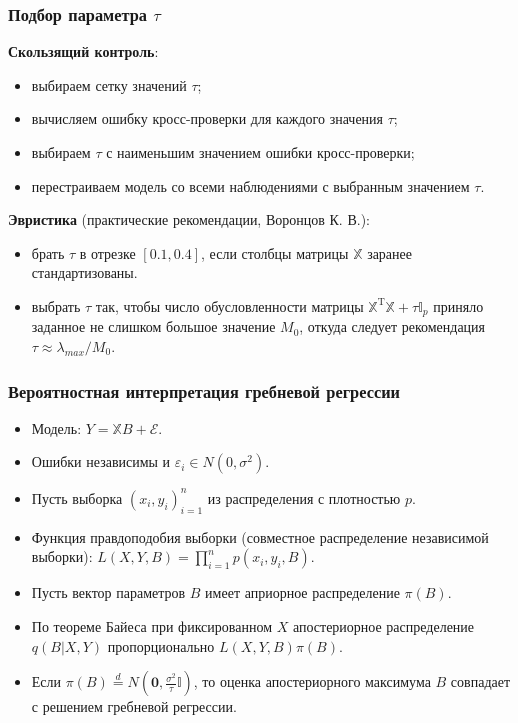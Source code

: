 \documentclass[10pt,unicode, notheorems]{beamer}
\begin{document}
\begin{frame}
\frametitle{Подбор параметра $\tau$ }

\textbf{Скользящий контроль}:%
\begin{itemize}
\item выбираем сетку значений $\tau$;
\item вычисляем ошибку кросс-проверки для каждого значения $\tau$;
\item выбираем $\tau$ с наименьшим значением ошибки кросс-проверки;
\item перестраиваем модель со всеми наблюдениями с выбранным значением $\tau$.
\end{itemize}

\textbf{Эвристика }(практические рекомендации, Воронцов К. В.):
\begin{itemize}
\item брать $\tau$ в отрезке $[0.1, 0.4]$, если столбцы матрицы $\mathbb{X}$ заранее
стандартизованы.
\item выбрать $\tau$ так, чтобы число обусловленности матрицы $\mathbb{X}^{\mathrm{T}}\mathbb{X}+\tau\mathbb{I}_{p}$ приняло заданное не слишком большое значение $M_{0}$, откуда следует рекомендация $\tau\approx\lambda_{max}/M_{0}$.
\end{itemize}
\end{frame}





\begin{frame}
\frametitle{Вероятностная интерпретация гребневой регрессии}
\begin{itemize}
\item Модель: $Y=\mathbb{X}B+\mathcal{E}$.
\item Ошибки независимы и $\varepsilon_{i}\in N(0,\sigma^{2})$.
\item Пусть выборка $(x_{i},y_{i})_{i=1}^{n}$ из распределения с плотностью $p$.
\item Функция правдоподобия выборки (совместное распределение независимой выборки): $L(X,Y,B)=\prod_{i=1}^{n}p(x_{i},y_{i},B)$.
\item Пусть вектор параметров $B$ имеет априорное распределение $\pi(B)$.
\item По теореме Байеса при фиксированном $X$ апостериорное распределение $q(B|X,Y)$ пропорционально $L(X,Y,B)\pi(B)$.
\item Если $\pi(B)\stackrel{d}{=}N(\bm{0},\frac{\sigma^{2}}{\tau}\mathbb{I})$, то оценка апостериорного максимума $B$ совпадает с решением гребневой регрессии.
\end{itemize}
\end{frame}
\end{document}
